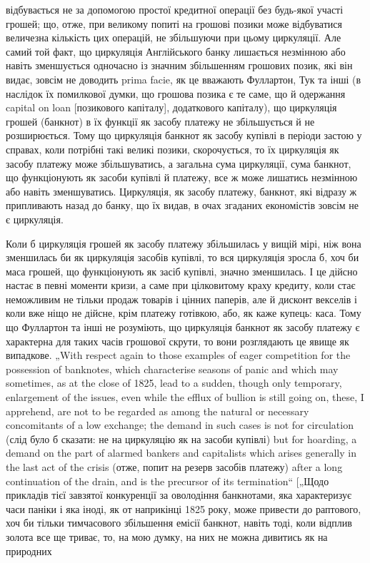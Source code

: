 \parcont{}  %
відбувається не за допомогою простої кредитної операції без
будь-якої участі грошей; що, отже, при великому попиті на грошові
позики може відбуватися величезна кількість цих операцій,
не збільшуючи при цьому циркуляції. Але самий той факт,
що циркуляція Англійського банку лишається незмінною або
навіть зменшується одночасно із значним збільшенням грошових
позик, які він видає, зовсім не доводить prima facie,
як це вважають Фуллартон, Тук та інші (в наслідок їх
помилкової думки, що грошова позика є те саме, що й одержання
capital on loan [позикового капіталу], додаткового капіталу), що
циркуляція грошей (банкнот) в їх функції як засобу платежу
не збільшується й не розширюється. Тому що циркуляція банкнот
як засобу купівлі в періоди застою у справах, коли потрібні такі
великі позики, скорочується, то їх циркуляція як засобу платежу
може збільшуватись, а загальна сума циркуляції, сума банкнот,
що функціонують як засоби купівлі й платежу, все ж може
лишатись незмінною або навіть зменшуватись. Циркуляція, як
засобу платежу, банкнот, які відразу ж припливають назад до
банку, що їх видав, в очах згаданих економістів зовсім не є
циркуляція.

Коли б циркуляція грошей як засобу платежу збільшилась
у вищій мірі, ніж вона зменшилась би як циркуляція засобів
купівлі, то вся циркуляція зросла б, хоч би маса грошей,
що функціонують як засіб купівлі, значно зменшилась. І це
дійсно настає в певні моменти кризи, а саме при цілковитому
краху кредиту, коли стає неможливим не тільки продаж товарів
і цінних паперів, але й дисконт векселів і коли вже ніщо не
дійсне, крім платежу готівкою, або, як каже купець: каса. Тому
що Фуллартон та інші не розуміють, що циркуляція банкнот як
засобу платежу є характерна для таких часів грошової скрути,
то вони розглядають це явище як випадкове. „With respect again
to those examples of eager competition for the possession of banknotes,
which characterise seasons of panic and which may sometimes,
as at the close of 1825, lead to a sudden, though only temporary,
enlargement of the issues, even while the efflux of bullion
is still going on, these, I apprehend, are not to be regarded as
among the natural or necessary concomitants of a low exchange; the
demand in such cases is not for circulation (слід було б сказати:
не на циркуляцію як на засоби купівлі) but for hoarding, a demand
on the part of alarmed bankers and capitalists which arises
generally in the last act of the crisis (отже, попит на резерв засобів
платежу) after a long continuation of the drain, and is the
precursor of its termination“ [„Щодо прикладів тієї завзятої конкуренції
за оволодіння банкнотами, яка характеризує часи
паніки і яка іноді, як от наприкінці 1825 року, може привести
до раптового, хоч би тільки тимчасового збільшення
емісії банкнот, навіть тоді, коли відплив золота все ще триває,
то, на мою думку, на них не можна дивитись як на природних
\parbreak{}  %
